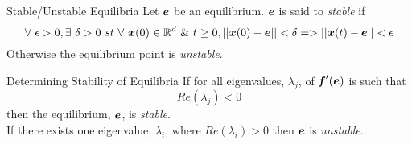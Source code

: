 \documentclass[11pt,a4paper]{article}
\begin{document}
\subtitle{Definition 16.4 - }{Stable/Unstable Equilibria}
Let $\boldsymbol{e}$ be an equilibrium. $\boldsymbol{e}$ is said to \textit{stable} if
$$\forall\ \epsilon > 0, \exists\ \delta > 0\ st\ \forall\ \boldsymbol{x}(0) \in \mathbb{R}^d\ \&\ t \geq 0, ||\boldsymbol{x}(0) - \boldsymbol{e}|| < \delta => ||\boldsymbol{x}(t) - \boldsymbol{e}|| < \epsilon$$
Otherwise the equilibrium point is \textit{unstable}.\\

\subtitle{Theorem 16.5 - }{Determining Stability of Equilibria}
If for all eigenvalues, $\lambda_j$, of $\boldsymbol{f}'(\boldsymbol{e})$ is such that
$$Re(\lambda_j) < 0$$
then the equilibrium, $\boldsymbol{e}$, is \textit{stable}.\\
If there exists one eigenvalue, $\lambda_i$, where $Re(\lambda_i) > 0$ then $\boldsymbol{e}$ is \textit{unstable}.
\end{document}
